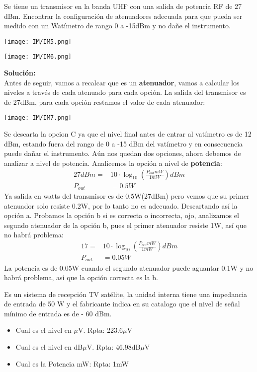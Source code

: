 \documentclass[
	11pt, %
	fleqn, %
	a4paper, %
]{LegrandOrangeBook}
\begin{document}
\begin{example}[Atenuadores]
Se tiene un transmisor en la banda UHF con una salida de potencia RF de 27 dBm. Encontrar la configuración de atenuadores adecuada para que
pueda ser medido con un Watímetro de rango 0 a -15dBm y no dañe el instrumento.\\
\begin{center}
\texttt{[image: IM/IM5.png]}
\end{center}
\begin{center}
\texttt{[image: IM/IM6.png]}
\end{center}
\textbf{Solución:}\\
Antes de seguir, vamos a recalcar que es un \textbf{atenuador}, vamos a calcular los niveles a través de cada atenuado para cada opción. La salida del transmisor es de 27dBm, para cada opción restamos el valor de cada atenuador:
\begin{center}
\texttt{[image: IM/IM7.png]}
\end{center}
Se descarta la opcion C ya que el nivel final antes de entrar al vatímetro es de 12 dBm, estando fuera del rango de 0 a -15 dBm del vatímetro y en consecuencia puede dañar el instrumento. Aún nos quedan dos opciones, ahora debemos de analizar a nivel de potencia. Analicemos la opción a nivel de \textbf{potencia}:
\begin{align*}
27dBm=&10\cdot \log_{10}\left(\frac{P_{out}mW}{1mW}\right)dBm\\
P_{out}&=0.5W
\end{align*}
Ya salida en watts del transmisor es de 0.5W(27dBm) pero vemos que su primer atenuador solo resiste 0.2W, por lo tanto no es adecuado. Descartando así la opción a. Probamos la opción b si es correcta o incorrecta, ojo, analizamos el segundo atenuador de la opción b, pues el primer atenuador resiste 1W, así que no habrá problema:
\begin{align*}
17=&10\cdot \log_{10}\left(\frac{P_{out}mW}{1mW}\right)dBm\\
P_{out}&=0.05W
\end{align*}
La potencia es de 0.05W cuando el segundo atenuador puede aguantar 0.1W y no habrá problema, así que la opción correcta es la b.
\end{example}
\begin{exercise}
Es un sistema de recepción TV satélite, la unidad interna tiene una impedancia de entrada de 50 W y el fabricante indica en su catalogo que
el nivel de señal mínimo de entrada es de - 60 dBm.
\begin{itemize}
\item Cual es el nivel en $\mu$V. Rpta: 223.6$\mu$V
\item Cual es el nivel en dB$\mu$V. Rpta: 46.98dB$\mu$V
\item Cual es la Potencia mW: Rpta: 1mW
\end{itemize}
\end{exercise}
\end{document}
